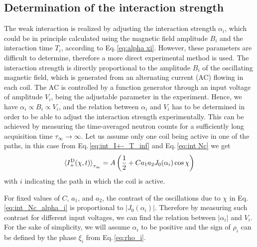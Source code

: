 \documentclass[12pt]{iopart}
\newcommand{\eq}{Eq.}
\begin{document}
\subsection{Determination of the interaction strength}
The weak interaction is realized by adjusting the interaction strength $\alpha_i$, which could be in principle calculated using the magnetic field amplitude $B_i$ and the interaction time $T_i$, according to \eq\,\eqref{eq:alpha xi}. However, these parameters are difficult to determine, therefore a more direct experimental method is used. The interaction strength is directly proportional to the amplitude $B_i$ of the oscillating magnetic field, which is generated from an alternating current (AC) flowing in each coil. The AC is controlled by a function generator through an input voltage of amplitude $V_i$, being the adjustable parameter in the experiment. Hence, we have $\alpha_i \propto B_i \propto V_i$,
and the relation between $\alpha_i$ and $V_i$ has to be determined in order to be able to adjust the interaction strength experimentally. This can be achieved by measuring the time-averaged neutron counts for a sufficiently long acquisition time $\tau_\infty\rightarrow\infty$. Let us assume only one coil being active in one of the paths, in this case from \eq\,\eqref{eq:int_I+-_T_inf} and \eq\,\eqref{eq:int Nc} we get
\begin{align}
\begin{aligned}   
    \braket{I^{\mathrm{D}}_+(\chi, t)}_{\tau_\infty}=A\left(\frac{1}{2} + C a_1 a_2 J_0(\alpha_i) \cos \chi \right) 
\end{aligned} \label{eq:int_Nc_alpha_i} 
\end{align}
with $i$ indicating the path in which the coil is active.

For fixed values of $C$, $a_1$, and $a_2$, the contrast of the oscillations due to $\chi$ in \eq\,\eqref{eq:int_Nc_alpha_i} is proportional to $\left|J_0(\alpha_i)\right|$. Therefore by measuring such contrast for different input voltages, we can find the relation between $\left|\alpha_i\right|$ and $V_i$. For the sake of simplicity, we will assume $\alpha_i$ to be positive and the sign of $\rho_i$ can be defined by the phase $\xi_i$ from \eq\,\eqref{eq:rho_i}.
\end{document}
